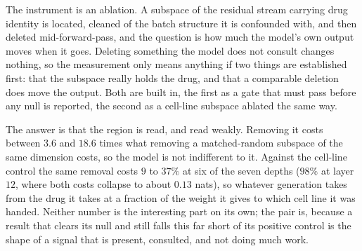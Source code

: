 \noindent
The instrument is an ablation. A subspace of the residual stream carrying drug
identity is located, cleaned of the batch structure it is confounded with, and
then deleted mid-forward-pass, and the question is how much the model's own
output moves when it goes. Deleting something the model does not consult
changes nothing, so the measurement only means anything if two things are
established first: that the subspace really holds the drug, and that a
comparable deletion does move the output. Both are built in, the first as a
gate that must pass before any null is reported, the second as a cell-line
subspace ablated the same way.

The answer is that the region is read, and read weakly. Removing it costs
between $3.6$ and $18.6$ times what removing a matched-random subspace of the
same dimension costs, so the model is not indifferent to it. Against the cell-line control the same removal costs $9$ to $37\%$ at six of the seven depths ($98\%$ at layer $12$, where both costs collapse to about $0.13$ nats), so whatever generation
takes from the drug it takes at a fraction of the weight it gives to which
cell line it was handed. Neither number is the interesting part on its own;
the pair is, because a result that clears its null and still falls this far
short of its positive control is the shape of a signal that is present,
consulted, and not doing much work.

